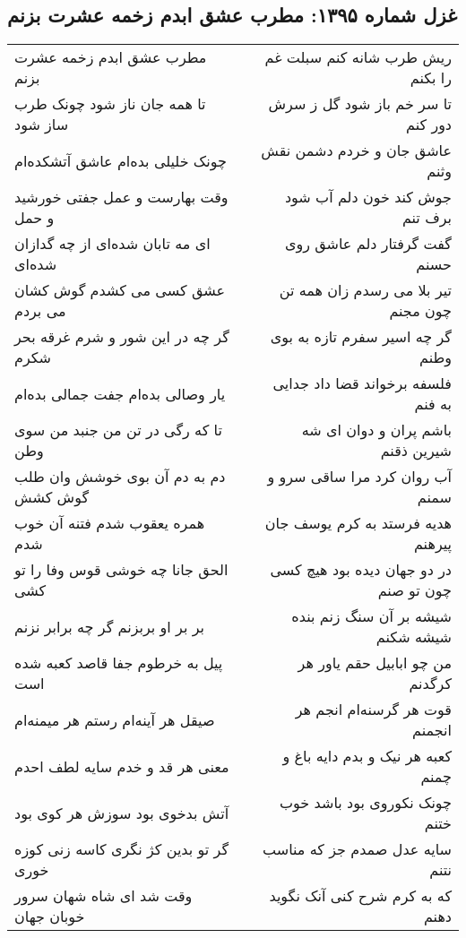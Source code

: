 \begin{center}
\section*{غزل شماره ۱۳۹۵: مطرب عشق ابدم زخمه عشرت بزنم}
\label{sec:1395}
\begin{longtable}{l p{0.5cm} r}
مطرب عشق ابدم زخمه عشرت بزنم
&&
ریش طرب شانه کنم سبلت غم را بکنم
\\
تا همه جان ناز شود چونک طرب ساز شود
&&
تا سر خم باز شود گل ز سرش دور کنم
\\
چونک خلیلی بده‌ام عاشق آتشکده‌ام
&&
عاشق جان و خردم دشمن نقش وثنم
\\
وقت بهارست و عمل جفتی خورشید و حمل
&&
جوش کند خون دلم آب شود برف تنم
\\
ای مه تابان شده‌ای از چه گدازان شده‌ای
&&
گفت گرفتار دلم عاشق روی حسنم
\\
عشق کسی می کشدم گوش کشان می بردم
&&
تیر بلا می رسدم زان همه تن چون مجنم
\\
گر چه در این شور و شرم غرقه بحر شکرم
&&
گر چه اسیر سفرم تازه به بوی وطنم
\\
یار وصالی بده‌ام جفت جمالی بده‌ام
&&
فلسفه برخواند قضا داد جدایی به فنم
\\
تا که رگی در تن من جنبد من سوی وطن
&&
باشم پران و دوان ای شه شیرین ذقنم
\\
دم به دم آن بوی خوشش وان طلب گوش کشش
&&
آب روان کرد مرا ساقی سرو و سمنم
\\
همره یعقوب شدم فتنه آن خوب شدم
&&
هدیه فرستد به کرم یوسف جان پیرهنم
\\
الحق جانا چه خوشی قوس وفا را تو کشی
&&
در دو جهان دیده بود هیچ کسی چون تو صنم
\\
بر بر او بربزنم گر چه برابر نزنم
&&
شیشه بر آن سنگ زنم بنده شیشه شکنم
\\
پیل به خرطوم جفا قاصد کعبه شده است
&&
من چو ابابیل حقم یاور هر کرگدنم
\\
صیقل هر آینه‌ام رستم هر میمنه‌ام
&&
قوت هر گرسنه‌ام انجم هر انجمنم
\\
معنی هر قد و خدم سایه لطف احدم
&&
کعبه هر نیک و بدم دایه باغ و چمنم
\\
آتش بدخوی بود سوزش هر کوی بود
&&
چونک نکوروی بود باشد خوب ختنم
\\
گر تو بدین کژ نگری کاسه زنی کوزه خوری
&&
سایه عدل صمدم جز که مناسب نتنم
\\
وقت شد ای شاه شهان سرور خوبان جهان
&&
که به کرم شرح کنی آنک نگوید دهنم
\\
\end{longtable}
\end{center}
